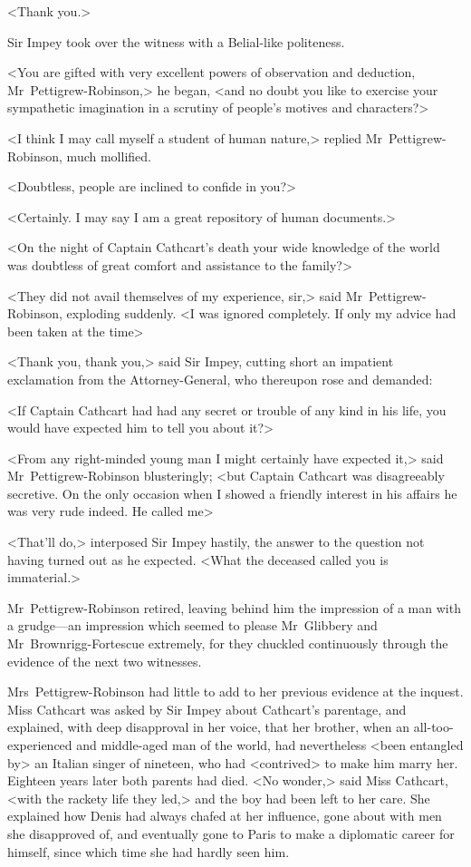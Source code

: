 <Thank you.>

Sir Impey took over the witness with a Belial-like politeness.

<You are gifted with very excellent powers of observation and deduction, Mr~Pettigrew-Robinson,> he began, <and no doubt you like to exercise your sympathetic imagination in a scrutiny of people's motives and characters?>

<I think I may call myself a student of human nature,> replied Mr~Pettigrew-Robinson, much mollified.

<Doubtless, people are inclined to confide in you?>

<Certainly. I may say I am a great repository of human documents.>

<On the night of Captain Cathcart's death your wide knowledge of the world was doubtless of great comfort and assistance to the family?>

<They did not avail themselves of my experience, sir,> said Mr~Pettigrew-Robinson, exploding suddenly. <I was ignored completely. If only my advice had been taken at the time\longdash>

<Thank you, thank you,> said Sir Impey, cutting short an impatient exclamation from the Attorney-General, who thereupon rose and demanded:

<If Captain Cathcart had had any secret or trouble of any kind in his life, you would have expected him to tell you about it?>

<From any right-minded young man I might certainly have expected it,> said Mr~Pettigrew-Robinson blusteringly; <but Captain Cathcart was disagreeably secretive. On the only occasion when I showed a friendly interest in his affairs he was very rude indeed. He called me\longdash>

<That'll do,> interposed Sir Impey hastily, the answer to the question not having turned out as he expected. <What the deceased called you is immaterial.>

Mr~Pettigrew-Robinson retired, leaving behind him the impression of a man with a grudge—an impression which seemed to please Mr~Glibbery and Mr~Brownrigg-Fortescue extremely, for they chuckled continuously through the evidence of the next two witnesses.

Mrs~Pettigrew-Robinson had little to add to her previous evidence at the inquest. Miss Cathcart was asked by Sir Impey about Cathcart's parentage, and explained, with deep disapproval in her voice, that her brother, when an all-too-experienced and middle-aged man of the world, had nevertheless <been entangled by> an Italian singer of nineteen, who had <contrived> to make him marry her. Eighteen years later both parents had died. <No wonder,> said Miss Cathcart, <with the rackety life they led,> and the boy had been left to her care. She explained how Denis had always chafed at her influence, gone about with men she disapproved of, and eventually gone to Paris to make a diplomatic career for himself, since which time she had hardly seen him.

